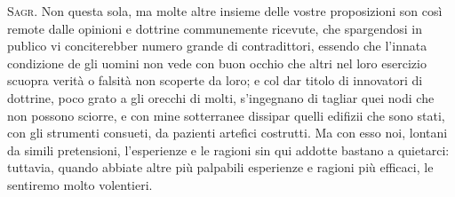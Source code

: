 \documentclass[11pt,twoside,openany]{book}
\newcommand{\speaker}[1]{\textcolor{rubric}{\textsc{#1}}\space}
\begin{document}
\speaker{Sagr.} Non questa sola, ma molte altre insieme delle vostre proposizioni son così remote dalle opinioni e dottrine communemente ricevute, che spargendosi in publico vi conciterebber numero grande di contradittori, essendo che l'innata condizione de gli uomini non vede con buon occhio che altri nel loro esercizio scuopra verità o falsità non scoperte da loro; e col dar titolo di innovatori di dottrine, poco grato a gli orecchi di molti, s'ingegnano di tagliar quei nodi che non possono sciorre, e con mine sotterranee dissipar quelli edifizii che sono stati, con gli strumenti consueti, da pazienti artefici costrutti. Ma con esso noi, lontani da simili pretensioni, l'esperienze e le ragioni sin qui addotte bastano a quietarci: tuttavia, quando abbiate altre più palpabili esperienze e ragioni più efficaci, le sentiremo molto volentieri.
\end{document}
